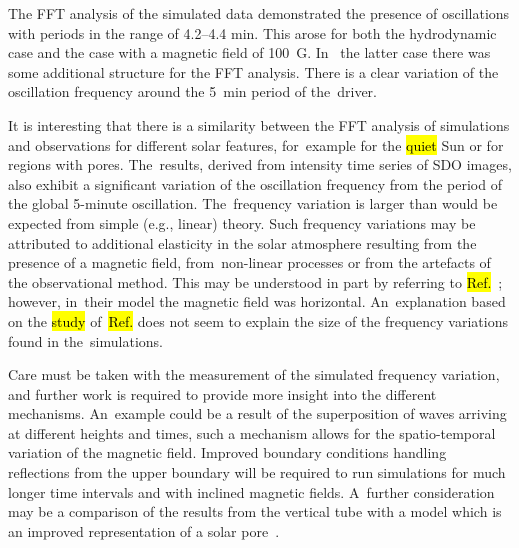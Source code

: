 \documentclass[physics,article,accept,pdftex,moreauthors]{Definitions/mdpi}
\begin{document}
The FFT analysis of the simulated data demonstrated the presence of oscillations with periods in the range of 4.2--4.4 min. This arose for both the hydrodynamic case and the case with a magnetic field of 100~G. In~ the latter case there was some additional structure for the FFT analysis. There is a clear variation of the oscillation frequency around the 5~min period of the~driver. 

It is interesting that there is a similarity between the FFT analysis  of simulations and observations for different solar features, for~example for the 
 \hl{quiet} 
Sun or for regions with pores. The~results, derived from intensity time series of SDO images, also exhibit a significant variation of the oscillation frequency from the period of the global 5-minute oscillation.  The~frequency variation is larger than would be expected from  simple (e.g., linear) theory. Such frequency variations may be attributed to additional elasticity in the solar atmosphere resulting from the presence of a magnetic field, from~non-linear processes or from the artefacts of the observational method. This  may be understood in part by referring to 
\hl{Ref.}~\cite{Campbell1989}; however, in~their model the magnetic field was horizontal. An~explanation based on 
 the %
 \hl{study} of~\hl{Ref.}
\cite{Hindman1996} does not seem to explain the size of the frequency variations found in the~simulations.

 
  
  

 
 
Care must be taken with the measurement of the simulated frequency variation, and further work is required to provide more insight into the different mechanisms. An~example could be a result of the superposition of waves arriving at different heights and times, such a mechanism allows for the spatio-temporal variation of the   magnetic field. Improved boundary conditions handling reflections from the upper boundary  will be required to run simulations for much longer time intervals and with inclined magnetic fields. A~further consideration may be a comparison of the results from the vertical tube with a model which is an improved representation of a solar pore~\cite{Simon1970,Cameron2007}.
\end{document}
